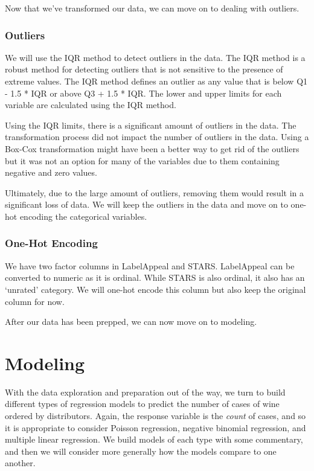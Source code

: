 \documentclass[
]{article}
\begin{document}
Now that we've transformed our data, we can move on to dealing with
outliers.

\subsubsection{Outliers}\label{outliers}

We will use the IQR method to detect outliers in the data. The IQR
method is a robust method for detecting outliers that is not sensitive
to the presence of extreme values. The IQR method defines an outlier as
any value that is below Q1 - 1.5 * IQR or above Q3 + 1.5 * IQR. The
lower and upper limits for each variable are calculated using the IQR
method.

Using the IQR limits, there is a significant amount of outliers in the
data. The transformation process did not impact the number of outliers
in the data. Using a Box-Cox transformation might have been a better way
to get rid of the outliers but it was not an option for many of the
variables due to them containing negative and zero values.

Ultimately, due to the large amount of outliers, removing them would
result in a significant loss of data. We will keep the outliers in the
data and move on to one-hot encoding the categorical variables.

\subsubsection{One-Hot Encoding}\label{one-hot-encoding}

We have two factor columns in LabelAppeal and STARS. LabelAppeal can be
converted to numeric as it is ordinal. While STARS is also ordinal, it
also has an `unrated' category. We will one-hot encode this column but
also keep the original column for now.

After our data has been prepped, we can now move on to modeling.

\section{Modeling}\label{modeling}

With the data exploration and preparation out of the way, we turn to
build different types of regression models to predict the number of
cases of wine ordered by distributors. Again, the response variable is
the \emph{count} of cases, and so it is appropriate to consider Poisson
regression, negative binomial regression, and multiple linear
regression. We build models of each type with some commentary, and then
we will consider more generally how the models compare to one another.
\end{document}
